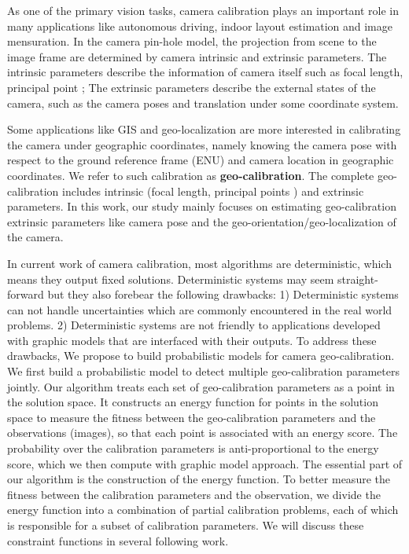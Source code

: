 As one of the primary vision tasks, camera calibration plays an
important role in many applications like autonomous driving, indoor
layout estimation and image mensuration. 
In the camera pin-hole model, the projection from scene to the image
frame are determined by camera intrinsic and extrinsic parameters. 
The intrinsic parameters describe the information of camera
itself such as focal length, principal point \etc; 
The extrinsic parameters describe the external states of the
camera, such as the camera poses and translation under some
coordinate system.

Some applications like GIS and geo-localization are more interested in
calibrating the camera under geographic coordinates, namely knowing
the camera pose with respect to the ground reference frame (\ie ENU)
and camera location in geographic coordinates. We refer to such
calibration as \textbf{geo-calibration}.
The complete geo-calibration includes intrinsic (focal
length, principal points \etc) and extrinsic parameters.
In this work, our study mainly focuses on estimating geo-calibration
extrinsic parameters like camera pose and the
geo-orientation/geo-localization of the camera.

In current work of camera calibration, most algorithms are
deterministic, which means they output fixed solutions. Deterministic
systems may seem straight-forward but they also forebear the following
drawbacks: 1) Deterministic systems can not handle uncertainties which
are commonly encountered in the real world problems.  2) Deterministic
systems are not friendly to applications developed with graphic models
that are interfaced with their outputs.
To address these drawbacks, We propose to build probabilistic
models for camera geo-calibration.
We first build a probabilistic model to detect multiple
geo-calibration parameters jointly.  Our algorithm treats each set of
geo-calibration parameters as a point in the solution space. It
constructs an energy function for points in the solution space to
measure the fitness between the geo-calibration parameters and the
observations (images), so that each point is associated with an energy
score.  The probability over the calibration parameters is
anti-proportional to the energy score, which we then compute with
graphic model approach. The essential part of our algorithm is the
construction of the energy function. To better measure the fitness
between the calibration parameters and the observation, we divide the
energy function into a combination of partial calibration problems,
each of which is responsible for a subset of calibration parameters.
We will discuss these constraint functions in several following work.
 
